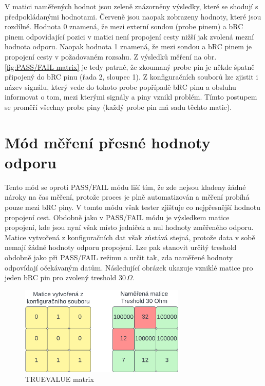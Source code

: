 V matici naměřených hodnot jsou zeleně znázorněny výsledky, které se shodují s předpokládanými hodnotami.
Červeně jsou naopak zobrazeny hodnoty, které jsou rozdílné. Hodnota 0 znamená, že mezi externí sondou (probe pinem)
a bRC pinem odpovídající pozici v matici není propojení cesty nižší jak zvolená mezní hodnota odporu.
Naopak hodnota 1 znamená, že mezi sondou a bRC pinem je propojení cesty v požadovaném rozsahu. Z výsledků
měření na obr. \ref{fig:PASS/FAIL matrix} je tedy patrné, že zkoumaný probe pin je někde špatně připojený do 
bRC pinu (řada 2, sloupec 1). Z konfiguračních souborů lze zjistit i název signálu, který vede do tohoto probe
popřípadě bRC pinu a obsluhu informovat o tom, mezi kterými signály a piny vznikl problém.
Tímto postupem se proměří všechny probe piny (každý probe pin má sadu těchto matic).\\


\section{Mód měření přesné hodnoty odporu}
Tento mód se oproti PASS/FAIL módu liší tím, že zde nejsou kladeny žádné nároky na čas měření, protože proces
je plně automatizován a měření probíhá pouze mezi bRC piny.
V tomto módu však tester zjišťuje co nejpřesnější hodnotu propojení cest.
Obdobně jako v PASS/FAIL módu je výsledkem matice propojení, kde jsou nyní však místo jedniček a nul hodnoty
změřeného odporu. Matice vytvořená z konfiguračních dat však zůstává stejná, protože data v sobě nemají
žádné hodnoty odporu propojení. Lze pak stanovit určitý treshold obdobně jako při PASS/FAIL režimu a
určit tak, zda naměřené hodnoty odpovídají očekávaným datům. Následující obrázek ukazuje 
vzniklé matice pro jeden bRC pin pro zvolený treshold 30\,$\Omega$.\\

\begin{figure}[ht!]
    \centering
    \includegraphics[width = 0.7\textwidth]{obrazky/MATRIX_TRUEVALUE.png}
    \caption{TRUEVALUE matrix}
    \label{fig:TRUEVALUE matrix}
\end{figure}

